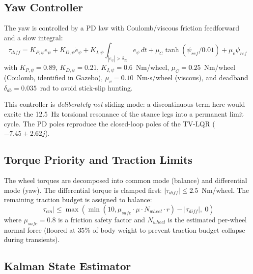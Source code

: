 \documentclass[11pt,a4paper]{article}
\begin{document}
\subsection{Yaw Controller}

The yaw is controlled by a PD law with Coulomb/viscous friction feedforward and a slow
integral:
\begin{equation}
    \tau_{diff} = K_{P,\psi} e_\psi + K_{D,\psi}\dot{e}_\psi +
    K_{I,\psi}\!\int_{\!|e_\psi|>\delta_{db}} e_\psi\,dt +
    \mu_C\tanh(\dot\psi_{ref}/0.01) + \mu_v\dot\psi_{ref}
\end{equation}
with $K_{P,\psi} = 0.89$, $K_{D,\psi} = 0.21$, $K_{I,\psi} = 0.6$~Nm/wheel,
$\mu_C = 0.25$~Nm/wheel (Coulomb, identified in Gazebo), $\mu_v = 0.10$~Nm$\cdot$s/wheel
(viscous), and deadband $\delta_{db} = 0.035$~rad to avoid stick-slip hunting.

This controller is \emph{deliberately not} sliding mode: a discontinuous term here would
excite the 12.5~Hz torsional resonance of the stance legs into a permanent limit cycle.
The PD poles reproduce the closed-loop poles of the TV-LQR ($-7.45 \pm 2.62j$).

\subsection{Torque Priority and Traction Limits}

The wheel torques are decomposed into common mode (balance) and differential mode (yaw).
The differential torque is clamped first: $|\tau_{diff}| \leq 2.5$~Nm/wheel.  The
remaining traction budget is assigned to balance:
\begin{equation}
    |\tau_{cm}| \leq \max\!\left(\min(10, \mu_{safe}\cdot\mu\cdot N_{wheel}\cdot r) -
    |\tau_{diff}|,\;0\right)
\end{equation}
where $\mu_{safe} = 0.8$ is a friction safety factor and $N_{wheel}$ is the estimated
per-wheel normal force (floored at 35\% of body weight to prevent traction budget
collapse during transients).

\subsection{Kalman State Estimator}
\end{document}
